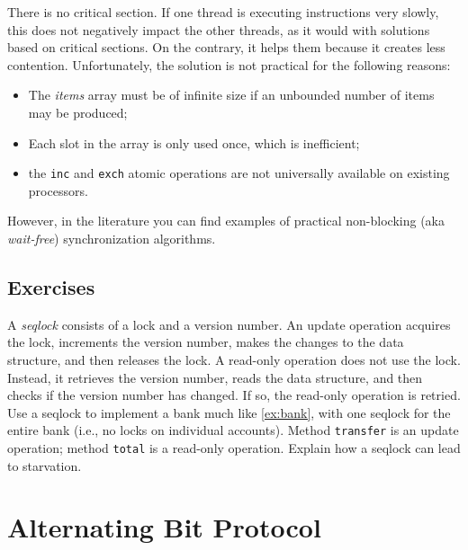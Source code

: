 \documentclass{report}
\begin{document}
{There is no critical section.  If one thread is executing instructions
very slowly, this does not negatively impact the other threads, as it
would with solutions based on critical sections.
On the contrary, it helps them because it creates less contention.
Unfortunately, the solution is not practical for the following reasons:
\begin{itemize}
\item The \textit{items} array must be of infinite size if an unbounded number
of items may be produced;
\item Each slot in the array is only used once, which is inefficient;
\item the \texttt{inc} and \texttt{exch} atomic operations are not
universally available on existing processors.
\end{itemize}
However, in the literature you can find examples of practical
non-blocking (aka \emph{wait-free})
%
synchronization algorithms.

\section*{Exercises}
\begin{problems}
\item A \emph{seqlock}
%
consists of a lock and a version number.
An update operation acquires the lock, increments the version number, makes the
changes to the data structure, and then releases the lock.  A read-only operation
does not use the lock.  Instead, it retrieves the version number,
reads the data structure, and then checks if the
version number has changed.  If so, the read-only operation is retried.
Use a seqlock to implement a bank much like \autoref{ex:bank}, with
one seqlock for the entire bank (i.e., no locks on individual accounts).
Method \texttt{transfer} is an update operation; method \texttt{total} is a
read-only operation.  Explain how a seqlock can lead to starvation.
\end{problems}

\chapter{Alternating Bit Protocol}
\label{ch:abp}
%
%
%

}
\end{document}
